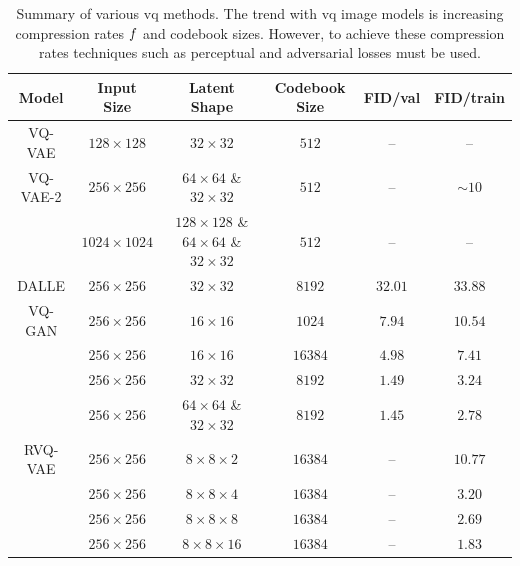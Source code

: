 \begin{table}[ht]
    \centering
    \begin{tabular}{|c|c|c|c|c|c|}
        \hline
        \textbf{Model} & \textbf{Input Size} & \textbf{Latent Shape} & \textbf{Codebook Size} & \textbf{FID/val} & \textbf{FID/train} \\
        \hline
        VQ-VAE & $128 \times 128$ & $32 \times 32$ & $512$ & -- & -- \\
        \hline
        VQ-VAE-2 & $256 \times 256$ & $64 \times 64$ \& $32 \times 32$ & $512$ & --& $\sim 10$ \\
                 & $1024 \times 1024$ & $128 \times 128$ \& $64 \times 64$ \& $32 \times 32$ & $512$ & -- & -- \\
        \hline
        DALLE & $256 \times 256$ & $32 \times 32$ & $8192$ & $32.01$ & $33.88$ \\
        \hline
        VQ-GAN & $256 \times 256$ & $16 \times 16$ & $1024$ & $7.94$ & $10.54$ \\
        & $256 \times 256$ & $16 \times 16$ & $16384$ & $4.98$ & $7.41$ \\
        & $256 \times 256$ & $32 \times 32$ & $8192$ & $1.49$ & $3.24$ \\
        & $256 \times 256$ & $64 \times 64$ \& $32 \times 32$ & $8192$ & $1.45$ & $2.78$ \\
        \hline
        RVQ-VAE & $256 \times 256$ & $8 \times 8 \times 2$ & $16384$ & -- & $10.77$ \\
        & $256 \times 256$ & $8 \times 8 \times 4$ & $16384$ & -- & $3.20$ \\
        & $256 \times 256$ & $8 \times 8 \times 8$ & $16384$ & -- & $2.69$ \\
        & $256 \times 256$ & $8 \times 8 \times 16$ & $16384$ & -- & $1.83$ \\
        \hline
    \end{tabular}
    \caption[Table]{Summary of various \acrfull{vq} methods. The trend with
    \gls{vq} image models is increasing compression rates $f$ and
    codebook sizes. However, to achieve these compression rates techniques such
    as perceptual and adversarial losses must be used.}
    \label{tab:vq}
\end{table}

